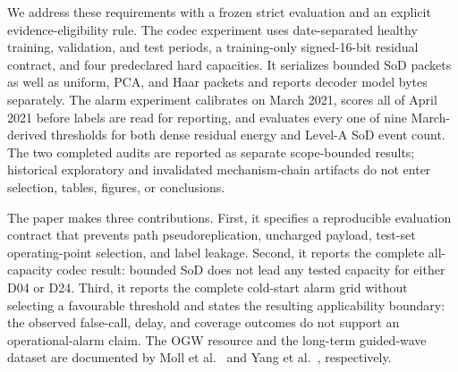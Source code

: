 We address these requirements with a frozen strict evaluation and an explicit
evidence-eligibility rule. The codec experiment uses date-separated healthy
training, validation, and test periods, a training-only signed-16-bit
residual contract, and four predeclared hard capacities. It serializes bounded
SoD packets as well as uniform, PCA, and Haar packets and reports decoder
model bytes separately. The alarm experiment calibrates on March 2021, scores
all of April 2021 before labels are read for reporting, and evaluates every
one of nine March-derived thresholds for both dense residual energy and
Level-A SoD event count. The two completed audits are reported as separate
scope-bounded results; historical exploratory and invalidated mechanism-chain
artifacts do not enter selection, tables, figures, or conclusions.

The paper makes three contributions. First, it specifies a reproducible
evaluation contract that prevents path pseudoreplication, uncharged payload,
test-set operating-point selection, and label leakage. Second, it reports
the complete all-capacity codec result: bounded SoD does not lead any tested
capacity for either D04 or D24. Third, it reports the complete cold-start
alarm grid without selecting a favourable threshold and states the resulting
applicability boundary: the observed false-call, delay, and coverage outcomes
do not support an operational-alarm claim. The OGW resource and the
long-term guided-wave dataset are documented by Moll et al.\ \cite{moll2019ogw}
and Yang et al.\ \cite{yang2025dataset}, respectively.
